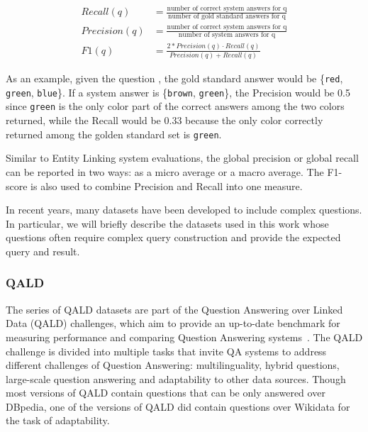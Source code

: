 \begin{equation}
    \begin{aligned}
    Recall(q) &= \frac{\mbox{number of correct system answers for q}}{\mbox{number of gold standard answers for q}} \\
    Precision(q) &= \frac{\mbox{number of correct system answers for q}}{\mbox{number of system answers for q}} \\
    F1(q) &= \frac{2 \ast Precision(q) \cdot Recall(q)}{Precision(q)+Recall(q)}
    \end{aligned}
\end{equation}

As an example, given the question , the gold standard 
answer would be \{\texttt{red}, \texttt{green}, \texttt{blue}\}. If a system answer is 
\{\texttt{brown}, \texttt{green}\}, the Precision would be 0.5 since \texttt{green} is the 
only color part of the correct answers among the two colors returned, while the Recall would be 
0.33 because the only color correctly returned among the golden standard set is \texttt{green}.

Similar to Entity Linking system evaluations, the global precision or global recall can be 
reported in two ways: as a micro average or a macro average. The F1-score is also used to 
combine Precision and Recall into one measure.

In recent years, many datasets have been developed to include complex questions. In particular, 
we will briefly describe the datasets used in this work whose questions often require complex 
query construction and provide the expected query and result.

\subsubsection{QALD}
\label{cap2:theoFrame/qakg/benchmarkDatasets/qald}
The series of QALD datasets are part of the Question Answering over Linked Data (QALD) challenges, 
which aim to provide an up-to-date benchmark for measuring performance and comparing Question 
Answering systems~\cite{qa:qald-Lopezetal2013}. The QALD challenge is divided into multiple 
tasks that invite QA systems to address different challenges of Question Answering: 
multilinguality, hybrid questions, large-scale question answering and adaptability to other 
data sources. Though most versions of QALD contain questions that can be only answered over 
DBpedia, one of the versions of QALD did contain questions over Wikidata for the task of 
adaptability.

